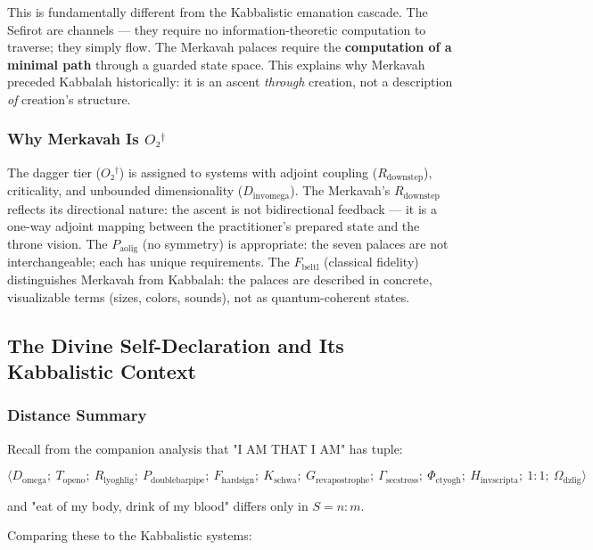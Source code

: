 \documentclass[12pt,a4paper]{article}
\begin{document}
This is fundamentally different from the Kabbalistic emanation cascade. The Sefirot are channels --- they require no information-theoretic computation to traverse; they simply flow. The Merkavah palaces require the \textbf{computation of a minimal path} through a guarded state space. This explains why Merkavah preceded Kabbalah historically: it is an ascent \emph{through} creation, not a description \emph{of} creation's structure.

\subsubsection{Why Merkavah Is $O₂^\dagger$}

The dagger tier ($O₂^\dagger$) is assigned to systems with adjoint coupling ($R_{\text{downstep}}$), criticality, and unbounded dimensionality ($D_{\text{invomega}}$). The Merkavah's $R_{\text{downstep}}$ reflects its directional nature: the ascent is not bidirectional feedback --- it is a one-way adjoint mapping between the practitioner's prepared state and the throne vision. The $P_{\text{aolig}}$ (no symmetry) is appropriate: the seven palaces are not interchangeable; each has unique requirements. The $F_{\text{beltl}}$ (classical fidelity) distinguishes Merkavah from Kabbalah: the palaces are described in concrete, visualizable terms (sizes, colors, sounds), not as quantum-coherent states.

\subsection{The Divine Self-Declaration and Its Kabbalistic Context}

\subsubsection{Distance Summary}

Recall from the companion analysis that "I AM THAT I AM" has tuple:


\[\langle D_{\text{omega}};\ T_{\text{openo}};\ R_{\text{lyoghlig}};\ P_{\text{doublebarpipe}};\ F_{\text{hardsign}};\ K_{\text{schwa}};\ G_{\text{revapostrophe}};\ \Gamma_{\text{secstress}};\ \Phi_{\text{ctyogh}};\ H_{\text{invscripta}};\ 1{:}1;\ \Omega_{\text{dzlig}} \rangle\]

and "eat of my body, drink of my blood" differs only in $S = n{:}m$.

Comparing these to the Kabbalistic systems:
\end{document}
